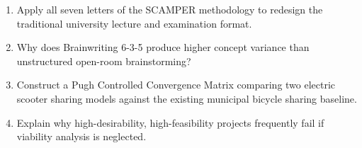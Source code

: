 \begin{practiceset}
\begin{enumerate}[leftmargin=1.5em]
    \item Apply all seven letters of the SCAMPER methodology to redesign the traditional university lecture and examination format.
    \item Why does Brainwriting 6-3-5 produce higher concept variance than unstructured open-room brainstorming?
    \item Construct a Pugh Controlled Convergence Matrix comparing two electric scooter sharing models against the existing municipal bicycle sharing baseline.
    \item Explain why high-desirability, high-feasibility projects frequently fail if viability analysis is neglected.
\end{enumerate}
\end{practiceset}
